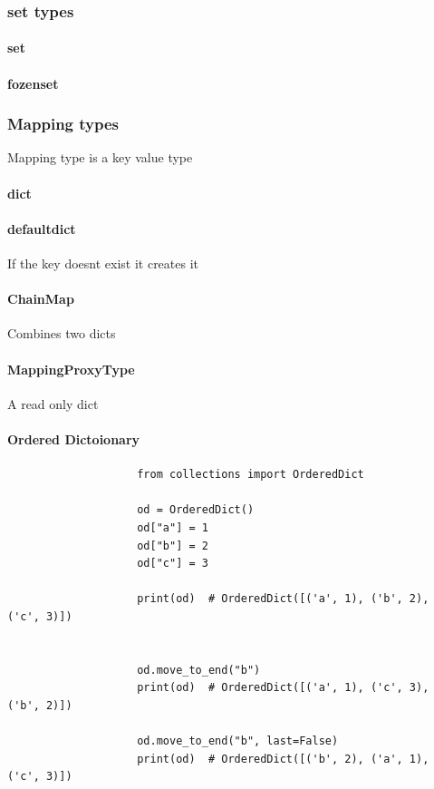         \subsubsection{set types}
            \paragraph{set}
            \paragraph{fozenset}
        
        \subsubsection{Mapping types}
            Mapping type is a key value type
            \paragraph{dict}
            \paragraph{defaultdict}
                If the key doesnt exist it creates it
            \paragraph{ChainMap}
                Combines two dicts
            \paragraph{MappingProxyType}
                A read only dict
            \paragraph{Ordered Dictoionary}
                \begin{verbatim}
                    from collections import OrderedDict
        
                    od = OrderedDict()
                    od["a"] = 1
                    od["b"] = 2
                    od["c"] = 3
                    
                    print(od)  # OrderedDict([('a', 1), ('b', 2), ('c', 3)])
        
                    
                    od.move_to_end("b")
                    print(od)  # OrderedDict([('a', 1), ('c', 3), ('b', 2)])
        
                    od.move_to_end("b", last=False)
                    print(od)  # OrderedDict([('b', 2), ('a', 1), ('c', 3)])
                \end{verbatim}
    

